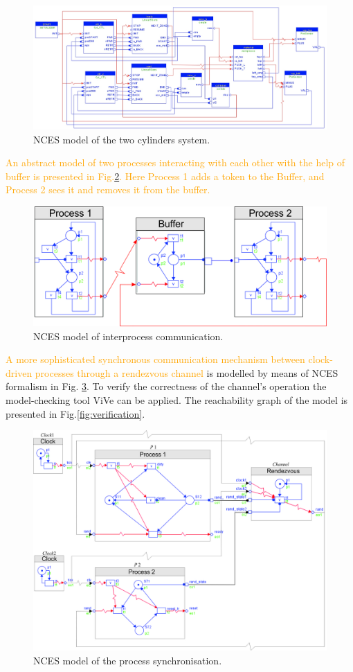 \documentclass[runningheads]{llncs}
\newcommand{\VV}[1]{\textcolor{orange}{#1}}
\begin{document}
\begin {figure}
    \centering
    \includegraphics [width = .9 \textwidth] {images/nces_two_cylinders.jpg}
    \caption {NCES model of the two cylinders system.}
    \label {fig:nces_2_cyl}
\end {figure}

\VV{An abstract model of two processes interacting with each other with the help of buffer is presented in Fig.\ref{fig:nces_interprocess}. Here Process 1 adds a token to the Buffer, and Process 2 sees it and removes it from the buffer.}

\begin {figure}
    \centering
    \includegraphics [width = .7 \textwidth] {images/interprocess.jpg}
    \caption {NCES model of interprocess communication.}
    \label {fig:nces_interprocess}
\end {figure}

\VV{A more sophisticated synchronous communication mechanism between clock-driven processes through a rendezvous channel} is modelled by means of NCES formalism in Fig. \ref{fig:rendezvous}. To verify the correctness of the channel’s operation the model-checking tool ViVe can be applied. The reachability graph of the model is presented in Fig.\ref{fig:verification}. 

\begin {figure}
    \centering
    \includegraphics [width = .8 \textwidth] {images/rendezvous2.jpg}
    \caption {NCES model of the process synchronisation.}
    \label {fig:rendezvous}
\end {figure}
\end{document}
